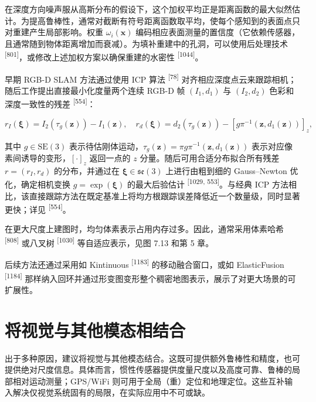 在深度方向噪声服从高斯分布的假设下，这个加权平均正是距离函数的最大似然估计。为提高鲁棒性，通常对截断有符号距离函数取平均，使每个感知到的表面点只对重建产生局部影响。权重 $\omega _ { i } ( \pmb { x } )$ 编码相应表面测量的置信度（它依赖传感器，且通常随到物体距离增加而衰减）。为填补重建中的孔洞，可以使用后处理技术 \textsuperscript{[801]}，或修改上述加权方案以确保重建的水密性 \textsuperscript{[1044]}。

早期 RGB-D SLAM 方法通过使用 ICP 算法 \textsuperscript{[78]} 对齐相应深度点云来跟踪相机；随后工作提出直接最小化度量两个连续 RGB-D 帧 $( I _ { 1 } , d _ { 1 } )$ 与 $( I _ { 2 } , d _ { 2 } )$ 色彩和深度一致性的残差 \textsuperscript{[554]}：

\begin{equation}
r _ {I} (\boldsymbol {\xi}) = I _ {2} \left(\tau_ {g} (\boldsymbol {z})\right) - I _ {1} (\boldsymbol {z}), \quad r _ {d} (\boldsymbol {\xi}) = d _ {2} \left(\tau_ {g} (\boldsymbol {z})\right) - \left[ g \pi^ {- 1} \left(\boldsymbol {z}, d _ {1} (\boldsymbol {z})\right) \right] _ {z},\tag{7.13}
\end{equation}

其中 $g \in \mathrm { S E } ( 3 )$ 表示待估刚体运动，$\tau _ { g } (\boldsymbol {z}) = \pi g \pi ^ { - 1 } (\boldsymbol {z}, d _ { 1 } (\boldsymbol {z}))$ 表示对应像素间诱导的变形，$[ \cdot ] _ { z }$ 返回一点的 $z$ 分量。随后可用合适分布拟合所有残差 $r = ( r _ { I } , r _ { d } )$ 的分布，并通过在 $\boldsymbol {\xi} \in \mathfrak {se}(3)$ 上进行由粗到细的 Gauss--Newton 优化，确定相机变换 $g = \exp (\boldsymbol {\xi})$ 的最大后验估计 \textsuperscript{[1029, 553]}。与经典 ICP 方法相比，该直接跟踪方法在既定基准上将均方根跟踪误差降低近一个数量级，同时显著更快；详见 \textsuperscript{[554]}。

在更大尺度上建图时，均匀体素表示占用内存过多。因此，通常采用体素哈希 \textsuperscript{[808]} 或八叉树 \textsuperscript{[1030]} 等自适应表示，见图 7.13 和第 5 章。

后续方法还通过采用如 Kintinuous \textsuperscript{[1183]} 的移动融合窗口，或如 ElasticFusion \textsuperscript{[1184]} 那样纳入回环并通过形变图变形整个稠密地图表示，展示了对更大场景的可扩展性。

\section{将视觉与其他模态相结合}

出于多种原因，建议将视觉与其他模态结合。这既可提供额外鲁棒性和精度，也可提供绝对尺度信息。具体而言，惯性传感器提供度量尺度以及高度可靠、鲁棒的局部相对运动测量；GPS/WiFi 则可用于全局（重）定位和地理定位。这些互补输入解决仅视觉系统固有的局限，在实际应用中不可或缺。

